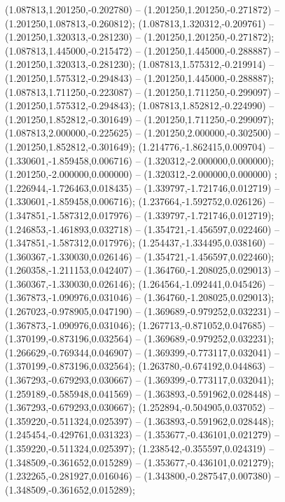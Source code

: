  (1.087813,1.201250,-0.202780) -- (1.201250,1.201250,-0.271872) -- (1.201250,1.087813,-0.260812);
 (1.087813,1.320312,-0.209761) -- (1.201250,1.320313,-0.281230) -- (1.201250,1.201250,-0.271872);
 (1.087813,1.445000,-0.215472) -- (1.201250,1.445000,-0.288887) -- (1.201250,1.320313,-0.281230);
 (1.087813,1.575312,-0.219914) -- (1.201250,1.575312,-0.294843) -- (1.201250,1.445000,-0.288887);
 (1.087813,1.711250,-0.223087) -- (1.201250,1.711250,-0.299097) -- (1.201250,1.575312,-0.294843);
 (1.087813,1.852812,-0.224990) -- (1.201250,1.852812,-0.301649) -- (1.201250,1.711250,-0.299097);
 (1.087813,2.000000,-0.225625) -- (1.201250,2.000000,-0.302500) -- (1.201250,1.852812,-0.301649);
 (1.214776,-1.862415,0.009704) -- (1.330601,-1.859458,0.006716) -- (1.320312,-2.000000,0.000000);
 (1.201250,-2.000000,0.000000) -- (1.320312,-2.000000,0.000000) ;
 (1.226944,-1.726463,0.018435) -- (1.339797,-1.721746,0.012719) -- (1.330601,-1.859458,0.006716);
 (1.237664,-1.592752,0.026126) -- (1.347851,-1.587312,0.017976) -- (1.339797,-1.721746,0.012719);
 (1.246853,-1.461893,0.032718) -- (1.354721,-1.456597,0.022460) -- (1.347851,-1.587312,0.017976);
 (1.254437,-1.334495,0.038160) -- (1.360367,-1.330030,0.026146) -- (1.354721,-1.456597,0.022460);
 (1.260358,-1.211153,0.042407) -- (1.364760,-1.208025,0.029013) -- (1.360367,-1.330030,0.026146);
 (1.264564,-1.092441,0.045426) -- (1.367873,-1.090976,0.031046) -- (1.364760,-1.208025,0.029013);
 (1.267023,-0.978905,0.047190) -- (1.369689,-0.979252,0.032231) -- (1.367873,-1.090976,0.031046);
 (1.267713,-0.871052,0.047685) -- (1.370199,-0.873196,0.032564) -- (1.369689,-0.979252,0.032231);
 (1.266629,-0.769344,0.046907) -- (1.369399,-0.773117,0.032041) -- (1.370199,-0.873196,0.032564);
 (1.263780,-0.674192,0.044863) -- (1.367293,-0.679293,0.030667) -- (1.369399,-0.773117,0.032041);
 (1.259189,-0.585948,0.041569) -- (1.363893,-0.591962,0.028448) -- (1.367293,-0.679293,0.030667);
 (1.252894,-0.504905,0.037052) -- (1.359220,-0.511324,0.025397) -- (1.363893,-0.591962,0.028448);
 (1.245454,-0.429761,0.031323) -- (1.353677,-0.436101,0.021279) -- (1.359220,-0.511324,0.025397);
 (1.238542,-0.355597,0.024319) -- (1.348509,-0.361652,0.015289) -- (1.353677,-0.436101,0.021279);
 (1.232265,-0.281927,0.016046) -- (1.343800,-0.287547,0.007380) -- (1.348509,-0.361652,0.015289);
